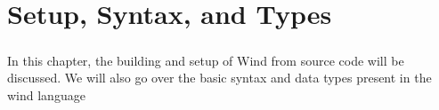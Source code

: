 
\chapter{Setup, Syntax, and Types}

\paragraph{  } In this chapter, the building and setup of Wind from source code will be discussed. We will also go over the basic syntax and data types present in the wind language